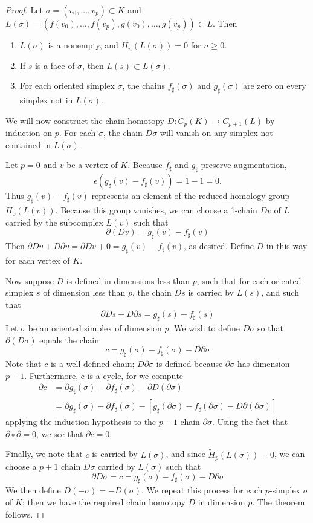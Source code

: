 \documentclass[toc=bib, headinclude]{scrartcl}
\theoremstyle{plain}
\theoremstyle{definition}
\theoremstyle{remark}
\begin{document}
\begin{proof}
	Let $\sigma=(v_0,\dots, v_p)\subset K$ and $L(\sigma)=(f(v_0),\dots,f(v_p),g(v_0),\dots,g(v_p))\subset L$. Then
	\begin{enumerate}
		\item $L(\sigma)$ is a nonempty, and $\tilde{H}_n(L(\sigma))=0 $ for $n\geq 0$. 
		\item If $s$ is a face of $\sigma$, then $L(s)\subset L(\sigma)$.
		\item For each oriented simplex $\sigma$, the chains $f_\sharp(\sigma)$ and $g_\sharp(\sigma)$ are zero on every simplex not in $L(\sigma)$.
	\end{enumerate}
	
	We will now construct the chain homotopy $D: C_p(K)\to C_{p+1}(L)$ by induction on $p$. For each $\sigma$, the chain $D\sigma$ will vanish on any simplex not contained in $L(\sigma)$.
	
	Let $p=0$ and $v$ be a vertex of $K$. Because $f_\sharp$ and $g_\sharp$ preserve augmentation, \[
	\epsilon(g_\sharp(v)-f_\sharp(v))=1-1=0.
	\]
	Thus $g_\sharp(v)-f_\sharp(v)$ represents an element of the reduced homology group $\tilde{H}_0(L(v))$. %
	Because this group vanishes, we can choose a 1-chain $Dv$ of $L$ carried by the subcomplex $L(v)$ such that
	\[
	\partial(Dv)=g_\sharp(v)-f_\sharp(v)
	\]
	Then $\partial Dv+D\partial v=\partial Dv+0=g_\sharp(v)-f_\sharp(v)$, as desired. Define $D$ in this way for each vertex of $K$.
	
	Now suppose $D$ is defined in dimensions less than $p$, such that for each oriented simplex $s$ of dimension less than $p$, the chain $Ds$ is carried by $L(s)$, and such that 
	\[
	\partial Ds+D\partial s=g_\sharp(s)-f_\sharp(s)
	\]
	Let $\sigma$ be an oriented simplex of dimension $p$. We wish to define $D\sigma$ so that $\partial (D\sigma)$ equals the chain
	\[
	c=g_\sharp(\sigma)-f_\sharp(\sigma)-D\partial\sigma
	\]
	Note that $c$ is a well-defined chain; $D\partial\sigma$ is defined because $\partial \sigma$ has dimension $p-1$. Furthermore, c is a cycle, for we compute
	\begin{align*}
	\partial c&=\partial g_\sharp(\sigma)-\partial f_\sharp(\sigma)-\partial D(\partial \sigma)\\
	&=\partial g_\sharp(\sigma)-\partial f_\sharp(\sigma)-[g_\sharp(\partial\sigma)-f_\sharp(\partial\sigma)-D\partial(\partial\sigma)]
	\end{align*}
	applying the induction hypothesis to the $p-1$ chain $\partial\sigma$. Using the fact that $\partial\circ \partial=0$, we see that $\partial c=0$.
	
	Finally, we note that $c$ is carried by $L(\sigma)$, and since $\tilde{H}_p(L(\sigma))=0$, we can choose a $p+1$ chain $D\sigma$ carried by $L(\sigma)$ such that 
	\[
	\partial D\sigma=c=g_\sharp(\sigma)-f_\sharp(\sigma)-D\partial\sigma
	\]
	We then define $D(-\sigma)=-D(\sigma)$. We repeat this process for each $p$-simplex $\sigma$ of $K$; then we have the required chain homotopy $D$ in dimension $p$. The theorem follows.
\end{proof}	
	
\end{document}
